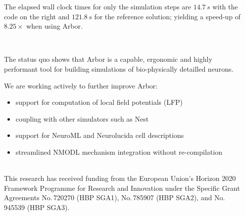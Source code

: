 \documentclass{beamer}
\begin{document}
\begin{frame}[t, fragile]
\begin{columns}[onlytextwidth]
\begin{column}{.49\linewidth}
      The elapsed wall clock times for only the simulation steps are $14.7\,s$
      with the code on the right and $121.8\,s$ for the reference solution;
      yielding a speed-up of $8.25\times$ when using Arbor.
    \end{column}
    \begin{column}{.49\linewidth}
      \inputminted[escapeinside=!!]{python}{src/model.py}
    \end{column}
  \end{columns}
  \vspace*{5ex}
  \begin{columns}[onlytextwidth]
    \begin{column}{.49\linewidth}
      \textbf{}\\
      The status quo shows that Arbor is a capable, ergonomic and highly
      performant tool for building simulations of bio-physically detailled
      neurons.

      We are working actively to further improve Arbor:
      \begin{itemize}
        \item support for computation of local field potentials (LFP)
        \item coupling with other simulators such as Nest
        \item support for NeuroML and Neurolucida cell descriptions
        \item streamlined NMODL mechanism integration without re-compilation
      \end{itemize}

      \textbf{}\\
      This research has received funding from the European Union's Horizon 2020
      Framework Programme for Research and Innovation under the Specific Grant
      Agreements No.\,720270 (HBP SGA1), No.\,785907 (HBP SGA2), and No.\,945539
      (HBP SGA3).\\[1.5ex]
    \end{column}
    \begin{column}{.49\linewidth}
      \textbf{}\\
      \printbibliography{}
    \end{column}
  \end{columns}
\end{frame}
\end{document}
